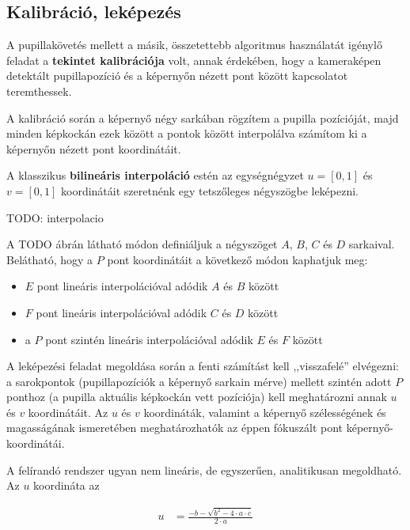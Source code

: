 \subsection{Kalibráció, leképezés}\label{sect:kalibracio}

A pupillakövetés mellett a másik, összetettebb algoritmus használatát igénylő feladat a \textbf{tekintet kalibrációja} volt, annak érdekében, hogy a kameraképen detektált pupillapozíció és a képernyőn nézett pont között kapcsolatot teremthessek.

A kalibráció során a képernyő négy sarkában rögzítem a pupilla pozícióját, majd minden képkockán ezek között a pontok között interpolálva számítom ki a képernyőn nézett pont koordinátáit.

\bigskip

A klasszikus \textbf{bilineáris interpoláció} estén az egységnégyzet $u = [0, 1]$ és $v = [0, 1]$ koordinátáit szeretnénk egy tetszőleges négyszögbe leképezni.

TODO: interpolacio

A TODO ábrán látható módon definiáljuk a négyszöget $A$, $B$, $C$ és $D$ sarkaival. Belátható, hogy a $P$ pont koordinátáit a következő módon kaphatjuk meg:

\begin{itemize}
  \item $E$ pont lineáris interpolációval adódik $A$ és $B$ között
  \item $F$ pont lineáris interpolációval adódik $C$ és $D$ között
  \item a $P$ pont szintén lineáris interpolációval adódik $E$ és $F$ között
\end{itemize}

A leképezési feladat megoldása során a fenti számítást kell ,,visszafelé'' elvégezni: a sarokpontok (pupillapozíciók a képernyő sarkain mérve) mellett szintén adott $P$ ponthoz (a pupilla aktuális képkockán vett pozíciója) kell meghatározni annak $u$ és $v$ koordinátáit. Az $u$ és $v$ koordináták, valamint a képernyő szélességének és magasságának ismeretében meghatározhatók az éppen fókuszált pont képernyő-koordinátái.

A felírandó rendszer ugyan nem lineáris, de egyszerűen, analitikusan megoldható. Az $u$ koordináta az

\begin{align}\label{eq:calib_1}
u &= \frac{-b - \sqrt{b^2 - 4 \cdot a \cdot c}}{2 \cdot a}
\end{align}

